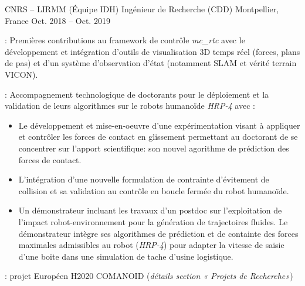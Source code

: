 \begin{cventries}
\cventry
    {CNRS -- LIRMM (Équipe IDH)} %
    {Ingénieur de Recherche (CDD)} %
    {Montpellier, France} %
    {Oct. 2018 -- Oct. 2019} %
    {
      \begin{cvitems} %
        \item {} : Premières contributions au framework de contrôle \emph{mc\_rtc} avec le développement et intégration d'outils de visualisation 3D temps réel (forces, plans de pas) et d'un système d'observation d'état (notamment SLAM et vérité terrain VICON).
        \item {} : Accompagnement technologique de doctorants pour le déploiement et la validation de leurs algorithmes sur le robots humanoïde \emph{HRP-4} avec :
        \begin{itemize}
          \item Le développement et mise-en-oeuvre d'une expérimentation visant à appliquer et contrôler les forces de contact en glissement permettant au doctorant de se concentrer sur l'apport scientifique: son nouvel agorithme de prédiction des forces de contact.
          \item L'intégration d'une nouvelle formulation de contrainte d'évitement de collision et sa validation au contrôle en boucle fermée du robot humanoïde.
          \item Un démonstrateur incluant les travaux d'un postdoc sur l'exploitation de l'impact robot-environnement pour la génération de trajectoires fluides. Le démonstrateur intègre ses algorithmes de prédiction et de containte des forces maximales admissibles au robot (\emph{HRP-4}) pour adapter la vitesse de saisie d'une boite dans une simulation de tache d'usine logistique.
        \end{itemize}
        \item {} : projet Européen H2020 COMANOID (\emph{détails section « Projets de Recherche»})
      \end{cvitems}
    }


\end{cventries}
